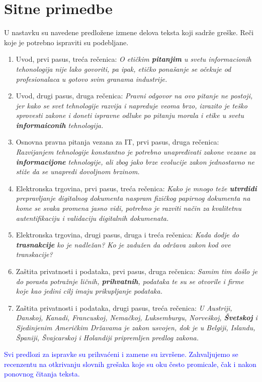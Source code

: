 \documentclass[a4paper]{report}
\newcommand{\odgovor}[1]{\textcolor{blue}{#1}}
\begin{document}
\section{Sitne primedbe}
U nastavku su navedene predložene izmene delova teksta koji sadrže greške. Reči koje je potrebno ispraviti su podebljane.
\begin{enumerate}
	\item Uvod, prvi pasus, treća rečenica: \textit{O etičkim \textbf{pitanjim} u svetu informacionih tehonologija nije lako govoriti, pa ipak, etičko ponašanje se očekuje od profesionalaca u gotovo svim granama industrije.}
	\item Uvod, drugi pasus, druga rečenica: \textit{Pravni odgovor na ovo pitanje ne postoji, jer kako se svet tehnologije razvija i napreduje  veoma brzo, izrazito je teško sprovesti zakone i doneti ispravne odluke po pitanju morala i etike u svetu \textbf{informaiconih} tehnologija.}
	\item Osnovna pravna pitanja vezana za IT, prvi pasus, druga rečenica: \textit{Razvijanjem tehnologije konstantno je potrebno unapređivati zakone vezane za \textbf{informacijone} tehnologije, ali zbog jako brze evolucije zakon jednostavno ne stiže da se unapredi dovoljnom brzinom.}
	\item Elektronska trgovina, prvi pasus, treća rečenica: \textit{Kako je mnogo teže \textbf{utvrdidi} prepravljanje digitalnog dokumenta naspram fizičkog papirnog dokumenta na kome se svaka promena jasno vidi, potrebno je razviti način za kvalitetnu autentifikaciju i validaciju digitalnih dokumenata.}
	\item Elektronska trgovina, drugi pasus, druga i treća rečenica: \textit{Kada dodje do \textbf{trasnakcije} ko je nadležan? Ko je zadužen da održava zakon kod ove transkacije?}
	\item Zaštita privatnosti i podataka, prvi pasus, druga rečenica: \textit{Samim tim došlo je do porasta potražnje ličnih, \textbf{prihvatnih}, podataka te su se otvorile i firme koje kao jedini cilj imaju prikupljanje podataka.}
	\item Zaštita privatnosti i podataka, drugi pasus, treća rečenica: \textit{U Austriji, Danskoj, Kanadi, Francuskoj, Nemačkoj, Luksemburgu, Norveškoj, \textbf{Šve\-tskoj} i Sjedinjenim Američkim Državama je zakon usvojen, dok je u Belgiji, Islandu, Španiji, Švajcarskoj i Holandiji pripremljen predlog zakona.}
\end{enumerate}
\odgovor{Svi predlozi za ispravke su prihvaćeni i zamene su izvršene. Zahvaljujemo se recenzentu na otkrivanju slovnih grešaka koje su oku često promicale, čak i nakon ponovnog čitanja teksta. }
\end{document}
